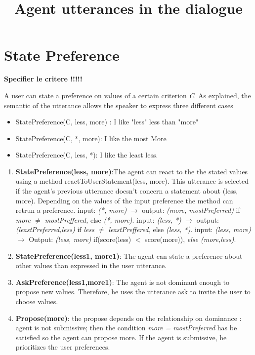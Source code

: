 \documentclass{llncs}
\begin{document}
\title{Agent utterances in the dialogue}
\maketitle 
\section{State Preference}
	\textbf{Specifier le critere !!!!!}
	\par A user can state a preference on values of a certain criterion \emph{C}. As explained, the semantic of the utterance allows the speaker to express three different cases
	\begin{itemize}
		\item StatePreference(C, less, more) : I like "less" less than "more"
		\item StatePreference(C, *, more): I like the most More
		\item StatePreference(C, less, *): I like the least less. 
	\end{itemize}
	
	\begin{enumerate}
		\item \textbf{StatePreference(less, more)}:The agent can react to the the stated values using a method reactToUserStatement(less, more). This utterance is selected if the agent's previous utterance doesn't concern a statement about (less, more).  Depending on the values of the input preference the method can retrun a preference. 
			\subitem input: \textit{(*, more)} $\rightarrow$ 
				output: \textit{(more, mostPreferred)} if \textit{more $\not = $ mostPreffered,} else \textit{(*, more)}.
			\subitem input: \textit{(less, *)} $\rightarrow$ 
				output: \textit{(leastPreferred,less)} if \textit{less $\not = $ leastPreffered,} else \textit{(less, *)}.
			\subitem input: \textit{(less, more)} $\rightarrow$ Output:  \textit{(less, more)} if(score(less) $<$ score(more)), \textit{else (more,less)}.
			
		\item \textbf{StatePreference(less1, more1)}: The agent can state a preference about other values than expressed in the user utterance.
		\item \textbf{AskPreference(less1,more1)}: The agent is not dominant enough to propose new values. Therefore, he uses the utterance ask to  invite the user to choose values.
		\item  \textbf{Propose(more)}: the propose depends on the relationship on dominance : 
			\subitem agent is not submissive; then  the condition \textit{more = mostPreferred} has be satisfied so the agent can propose more.
			\subitem If the agent is submissive, he prioritizes the user preferences. 
	\end{enumerate}
\end{document}
